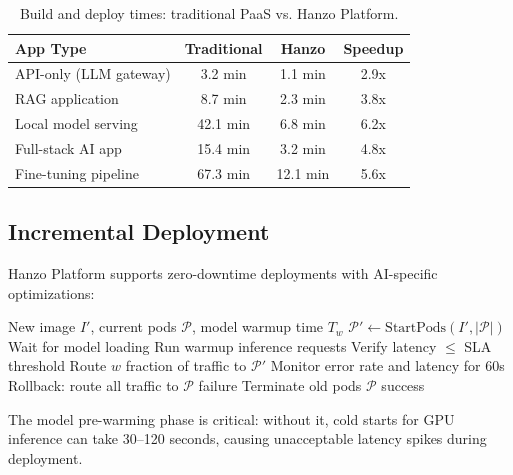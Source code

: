 \begin{table}[H]
\centering
\small
\begin{tabular}{lccc}
\toprule
\textbf{App Type} & \textbf{Traditional} & \textbf{Hanzo} & \textbf{Speedup} \\
\midrule
API-only (LLM gateway) & 3.2 min & 1.1 min & 2.9x \\
RAG application & 8.7 min & 2.3 min & 3.8x \\
Local model serving & 42.1 min & 6.8 min & 6.2x \\
Full-stack AI app & 15.4 min & 3.2 min & 4.8x \\
Fine-tuning pipeline & 67.3 min & 12.1 min & 5.6x \\
\bottomrule
\end{tabular}
\caption{Build and deploy times: traditional PaaS vs. Hanzo Platform.}
\label{tab:build_times}
\end{table}

\subsection{Incremental Deployment}

Hanzo Platform supports zero-downtime deployments with AI-specific optimizations:

\begin{algorithm}[H]
\caption{AI-Aware Rolling Deployment}
\label{alg:deploy}
\begin{algorithmic}[1]
\Require New image $I'$, current pods $\mathcal{P}$, model warmup time $T_w$
\State {}
\State $\mathcal{P}' \gets \text{StartPods}(I', |\mathcal{P}|)$
    \State Wait for model loading
    \State Run warmup inference requests
    \State Verify latency $\le$ SLA threshold
\EndFor
\State {}
    \State Route $w$ fraction of traffic to $\mathcal{P}'$
    \State Monitor error rate and latency for 60s
        \State Rollback: route all traffic to $\mathcal{P}$
        \State \Return failure
    \EndIf
\EndFor
\State {}
\State Terminate old pods $\mathcal{P}$
\State \Return success
\end{algorithmic}
\end{algorithm}

The model pre-warming phase is critical: without it, cold starts for GPU inference can take 30--120 seconds, causing unacceptable latency spikes during deployment.

